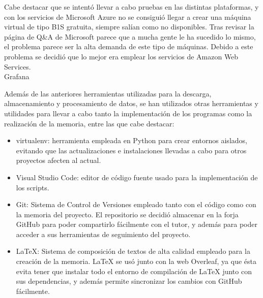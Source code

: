 Cabe destacar que se intentó llevar a cabo pruebas en las distintas plataformas, y con los servicios de Microsoft Azure no se consiguió llegar a crear una máquina virtual de tipo B1S gratuita, siempre salían como no disponibles. Tras revisar la página de Q&A de Microsoft parece que a mucha gente le ha sucedido lo mismo, el problema parece ser la alta demanda de este tipo de máquinas. Debido a este problema se decidió que lo mejor era emplear los servicios de Amazon Web Services.\\

Grafana

Además de las anteriores herramientas utilizadas para la descarga, almacenamiento y procesamiento de datos, se han utilizados otras herramientas y utilidades para llevar a cabo tanto la implementación de los programas como la realización de la memoria, entre las que cabe destacar:

\begin{itemize}
    \item virtualenv: herramienta empleada en Python para crear entornos aislados, evitando que las actualizaciones e instalaciones llevadas a cabo para otros proyectos afecten al actual.
    \item Visual Studio Code: editor de código fuente usado para la implementación de los scripts.
    \item Git: Sistema de Control de Versiones empleado tanto con el código como con la memoria del proyecto. El repositorio se decidió almacenar en la forja GitHub para poder compartirlo fácilmente con el tutor, y además para poder acceder a sus herramientas de seguimiento del proyecto.
    \item \LaTeX: Sistema de composición de textos de alta calidad empleado para la creación de la memoria. LaTeX se usó junto con la web Overleaf, ya que ésta evita tener que instalar todo el entorno de compilación de LaTeX junto con sus dependencias, y además permite sincronizar los cambios con GitHub fácilmente.
\end{itemize}
